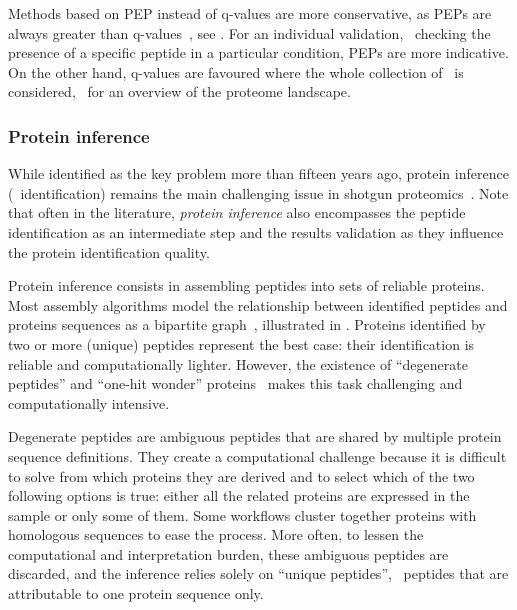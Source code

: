 Methods based on \gls{PEP} instead of q-values are more conservative,
as \glspl{PEP} are always greater than q-values~,
see .
For an individual validation,
\eg\ checking the presence of a specific peptide in a particular condition,
\glspl{PEP} are more indicative.
On the other hand, q-values are favoured
where the whole collection of \psms\ is considered,
\eg\ for an overview of the proteome landscape.~\mybr\

\subsubsection{Protein inference}\label{subsec:proteinInference}

While identified as the key problem more than fifteen years ago,
protein inference (\ie\ identification) remains
the main challenging issue in shotgun proteomics~.
Note that often in the literature,
\emph{protein inference} also encompasses
the peptide identification as an intermediate step
and the results validation
as they influence the protein identification quality.\mybr\

Protein inference consists
in assembling peptides into sets of reliable proteins.
Most assembly algorithms model
the relationship between identified peptides and proteins sequences
as a bipartite graph~, illustrated in .
Proteins identified by two or more (unique) peptides represent the best case:
their identification is reliable and computationally lighter.
However,
the existence of \enquote{degenerate peptides} and
\enquote{one-hit wonder} proteins~ makes
this task challenging and computationally intensive.\mybr\

Degenerate peptides are ambiguous peptides
that are shared by multiple protein sequence definitions.
They create a computational challenge
because it is difficult
to solve from which proteins they are derived
and to select which of the two following options is true:
either all the related proteins are expressed in the sample
or only some of them.
Some workflows cluster together proteins with homologous sequences
to ease the process.
More often, to lessen the computational and interpretation burden,
these ambiguous peptides are discarded, and
the inference relies solely on \enquote{unique peptides},
\ie\ peptides that are attributable to one protein sequence only.\mybr\

